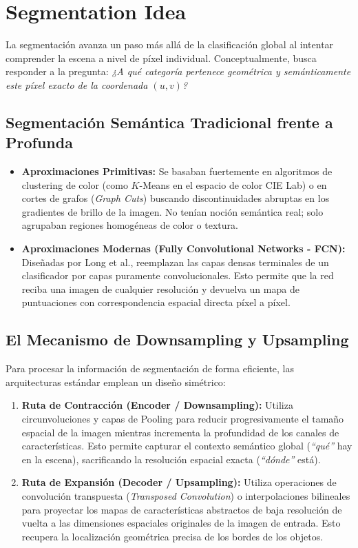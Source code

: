 \section{Segmentation Idea}

La segmentación avanza un paso más allá de la clasificación global al intentar comprender la escena a nivel de píxel individual. Conceptualmente, busca responder a la pregunta: \textit{¿A qué categoría pertenece geométrica y semánticamente este píxel exacto de la coordenada $(u, v)$?}

\subsection{Segmentación Semántica Tradicional frente a Profunda}
\begin{itemize}
    \item \textbf{Aproximaciones Primitivas:} Se basaban fuertemente en algoritmos de clustering de color (como $K$-Means en el espacio de color CIE Lab) o en cortes de grafos (\textit{Graph Cuts}) buscando discontinuidades abruptas en los gradientes de brillo de la imagen. No tenían noción semántica real; solo agrupaban regiones homogéneas de color o textura.
    \item \textbf{Aproximaciones Modernas (Fully Convolutional Networks - FCN):} Diseñadas por Long et al., reemplazan las capas densas terminales de un clasificador por capas puramente convolucionales. Esto permite que la red reciba una imagen de cualquier resolución y devuelva un mapa de puntuaciones con correspondencia espacial directa píxel a píxel.
\end{itemize}



\subsection{El Mecanismo de Downsampling y Upsampling}
\noindent
Para procesar la información de segmentación de forma eficiente, las arquitecturas estándar emplean un diseño simétrico:
\begin{enumerate}
    \item \textbf{Ruta de Contracción (Encoder / Downsampling):} Utiliza circunvoluciones y capas de Pooling para reducir progresivamente el tamaño espacial de la imagen mientras incrementa la profundidad de los canales de características. Esto permite capturar el contexto semántico global (\textit{``qué''} hay en la escena), sacrificando la resolución espacial exacta (\textit{``dónde''} está).
    \item \textbf{Ruta de Expansión (Decoder / Upsampling):} Utiliza operaciones de convolución transpuesta (\textit{Transposed Convolution}) o interpolaciones bilineales para proyectar los mapas de características abstractos de baja resolución de vuelta a las dimensiones espaciales originales de la imagen de entrada. Esto recupera la localización geométrica precisa de los bordes de los objetos.
\end{enumerate}


